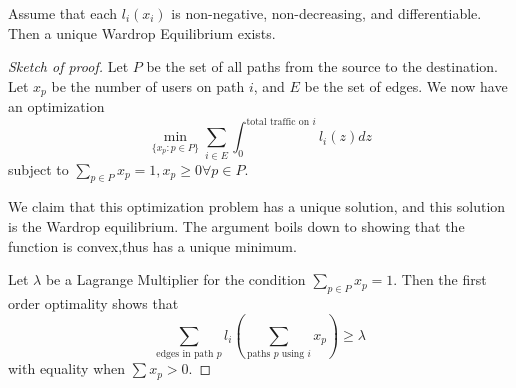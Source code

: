 \begin{center}
    \end{center}
\begin{atheorem}{}{}
    Assume that each $l_i(x_i)$ is non-negative, non-decreasing, and differentiable. Then a unique Wardrop Equilibrium exists.
\end{atheorem}
\begin{proof}[Sketch of proof]
    Let $P$ be the set of all paths from the source to the destination.
    Let $x_p$ be the number of users on path $i$, and $E$ be the set of edges. We now have an optimization \[
        \min_{\{x_p:p\in P\} } \sum_{i\in E} \int_{0}^{\textrm{total traffic on $i$}} l_i(z) dz
    \]
    subject to $\sum_{p\in P} x_p=1, x_p\geq 0 \forall p\in P$.

    We claim that this optimization problem has a unique solution, and this solution is the Wardrop equilibrium. The argument boils down to showing that the function is convex,thus has a unique minimum. 

    Let $\lambda$ be a Lagrange Multiplier for the condition $\sum_{p\in P} x_p=1$. Then the first order optimality shows that \[
    \sum_{\textrm{edges in path $p$}} l_i(\sum_{\textrm{paths $p$ using $i$}}x_p)\geq \lambda
    \]
    with equality when $\sum {x_p}>0$.
\end{proof}
